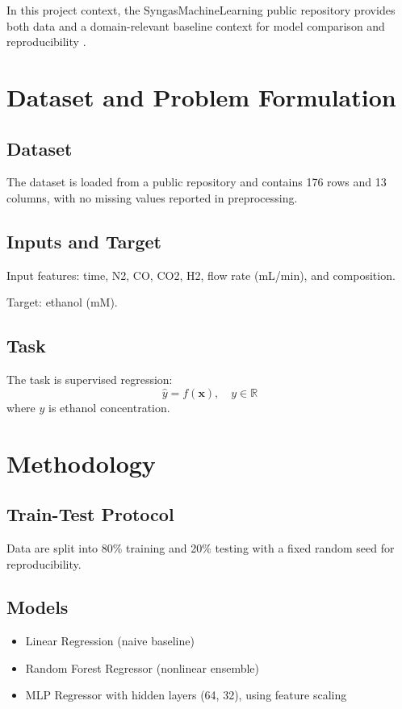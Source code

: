 \documentclass[conference]{IEEEtran}
\begin{document}
In this project context, the SyngasMachineLearning public repository provides both data and a domain-relevant baseline context for model comparison and reproducibility \cite{syngasrepo,sklearnrfdocs}.

\section{Dataset and Problem Formulation}
\subsection{Dataset}
The dataset is loaded from a public repository and contains 176 rows and 13 columns, with no missing values reported in preprocessing.

\subsection{Inputs and Target}
Input features: time, N2, CO, CO2, H2, flow rate (mL/min), and composition.

Target: ethanol (mM).

\subsection{Task}
The task is supervised regression:
\[
\hat{y} = f(\mathbf{x}), \quad y \in \mathbb{R}
\]
where $y$ is ethanol concentration.

\section{Methodology}
\subsection{Train-Test Protocol}
Data are split into 80\% training and 20\% testing with a fixed random seed for reproducibility.

\subsection{Models}
\begin{itemize}
\item Linear Regression (naive baseline)
\item Random Forest Regressor (nonlinear ensemble)
\item MLP Regressor with hidden layers (64, 32), using feature scaling
\end{itemize}
\end{document}
